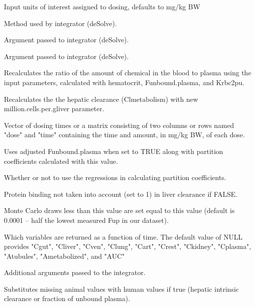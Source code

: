 \documentclass[a4paper]{book}
\begin{document}
\begin{Arguments}
\begin{ldescription}
\item[\code{input.units}] Input units of interest assigned to dosing, defaults to
mg/kg BW

\item[\code{method}] Method used by integrator (deSolve).

\item[\code{rtol}] Argument passed to integrator (deSolve).

\item[\code{atol}] Argument passed to integrator (deSolve).

\item[\code{recalc.blood2plasma}] Recalculates the ratio of the amount of chemical
in the blood to plasma using the input parameters, calculated with
hematocrit, Funbound.plasma, and Krbc2pu.

\item[\code{recalc.clearance}] Recalculates the the hepatic clearance
(Clmetabolism) with new million.cells.per.gliver parameter.

\item[\code{dosing.matrix}] Vector of dosing times or a matrix consisting of two
columns or rows named "dose" and "time" containing the time and amount, in
mg/kg BW, of each dose.

\item[\code{adjusted.Funbound.plasma}] Uses adjusted Funbound.plasma when set to
TRUE along with partition coefficients calculated with this value.

\item[\code{regression}] Whether or not to use the regressions in calculating
partition coefficients.

\item[\code{restrictive.clearance}] Protein binding not taken into account (set to
1) in liver clearance if FALSE.

\item[\code{minimum.Funbound.plasma}] Monte Carlo draws less than this value are set 
equal to this value (default is 0.0001 -- half the lowest measured Fup in our
dataset).

\item[\code{monitor.vars}] Which variables are returned as a function of time. 
The default value of NULL provides "Cgut", "Cliver", "Cven", "Clung", "Cart", 
"Crest", "Ckidney", "Cplasma", "Atubules", "Ametabolized", and "AUC"

\item[\code{...}] Additional arguments passed to the integrator.

\item[\code{3man}] Substitutes missing animal values with human values
if true (hepatic intrinsic clearance or fraction of unbound plasma).
\end{ldescription}
\end{Arguments}
\end{document}
